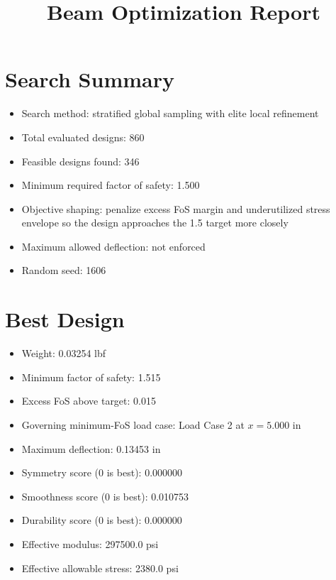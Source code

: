 \documentclass[11pt]{article}
\title{Beam Optimization Report}
\date{}
\begin{document}
\maketitle

\section*{Search Summary}
\begin{itemize}
\item Search method: stratified global sampling with elite local refinement
\item Total evaluated designs: 860
\item Feasible designs found: 346
\item Minimum required factor of safety: 1.500
\item Objective shaping: penalize excess FoS margin and underutilized stress envelope so the design approaches the 1.5 target more closely
\item Maximum allowed deflection: not enforced
\item Random seed: 1606
\end{itemize}

\section*{Best Design}
\begin{itemize}
\item Weight: 0.03254 lbf
\item Minimum factor of safety: 1.515
\item Excess FoS above target: 0.015
\item Governing minimum-FoS load case: Load Case 2 at $x=5.000$ in
\item Maximum deflection: 0.13453 in
\item Symmetry score (0 is best): 0.000000
\item Smoothness score (0 is best): 0.010753
\item Durability score (0 is best): 0.000000
\item Effective modulus: 297500.0 psi
\item Effective allowable stress: 2380.0 psi
\end{itemize}
\end{document}
